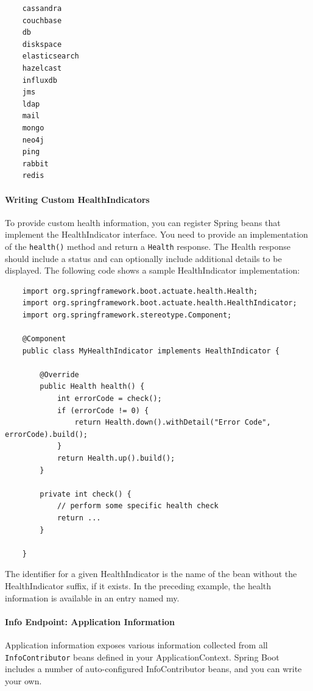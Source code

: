 \documentclass{scrartcl}
\begin{document}
\begin{lstlisting}
    cassandra
    couchbase
    db
    diskspace
    elasticsearch
    hazelcast
    influxdb
    jms
    ldap
    mail
    mongo
    neo4j
    ping
    rabbit
    redis
\end{lstlisting}

\paragraph{Writing Custom HealthIndicators}

To provide custom health information, you can register Spring beans that implement the HealthIndicator interface. You need to provide an implementation of the \lstinline|health()| method and return a \lstinline|Health| response. The Health response should include a status and can optionally include additional details to be displayed. The following code shows a sample HealthIndicator implementation:

    \begin{lstlisting}
    import org.springframework.boot.actuate.health.Health;
    import org.springframework.boot.actuate.health.HealthIndicator;
    import org.springframework.stereotype.Component;

    @Component
    public class MyHealthIndicator implements HealthIndicator {

        @Override
        public Health health() {
            int errorCode = check();
            if (errorCode != 0) {
                return Health.down().withDetail("Error Code", errorCode).build();
            }
            return Health.up().build();
        }

        private int check() {
            // perform some specific health check
            return ...
        }

    }
    \end{lstlisting}

The identifier for a given HealthIndicator is the name of the bean without the HealthIndicator suffix, if it exists. In the preceding example, the health information is available in an entry named my.

\paragraph{Info Endpoint: Application Information}

Application information exposes various information collected from all \lstinline|InfoContributor| beans defined in your ApplicationContext. Spring Boot includes a number of auto-configured InfoContributor beans, and you can write your own.
\end{document}
